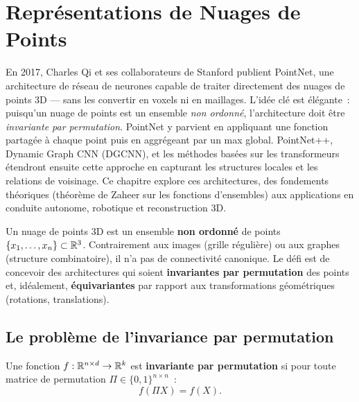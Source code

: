 \chapter{Repr\'esentations de Nuages de Points}
\label{ch:point_clouds}

En 2017, Charles Qi et ses collaborateurs de Stanford publient PointNet, une architecture de r\'eseau de neurones capable de traiter directement des nuages de points 3D --- sans les convertir en voxels ni en maillages. L'id\'ee cl\'e est \'el\'egante~: puisqu'un nuage de points est un ensemble \emph{non ordonn\'e}, l'architecture doit \^etre \emph{invariante par permutation}. PointNet y parvient en appliquant une fonction partag\'ee \`a chaque point puis en aggr\'egeant par un max global. PointNet++, Dynamic Graph CNN (DGCNN), et les m\'ethodes bas\'ees sur les transformeurs \'etendront ensuite cette approche en capturant les structures locales et les relations de voisinage. Ce chapitre explore ces architectures, des fondements th\'eoriques (th\'eor\`eme de Zaheer sur les fonctions d'ensembles) aux applications en conduite autonome, robotique et reconstruction 3D.

\begin{intuition}
Un nuage de points 3D est un ensemble
\textbf{non ordonn\'e} de points $\{x_1, \ldots, x_n\} \subset \mathbb{R}^3$.
Contrairement aux images (grille r\'eguli\`ere) ou aux graphes
(structure combinatoire), il n'a pas de connectivit\'e canonique.
Le d\'efi est de concevoir des architectures qui soient
\textbf{invariantes par permutation} des points et, id\'ealement,
\textbf{\'equivariantes} par rapport aux transformations g\'eom\'etriques
(rotations, translations).
\end{intuition}

\section{Le probl\`eme de l'invariance par permutation}

\begin{definition}
Une fonction $f : \mathbb{R}^{n \times d} \to \mathbb{R}^k$ est \textbf{invariante
par permutation} si pour toute matrice de permutation
$\Pi \in \{0,1\}^{n \times n}$~:
\[
  f(\Pi X) = f(X).
\]
\end{definition}

